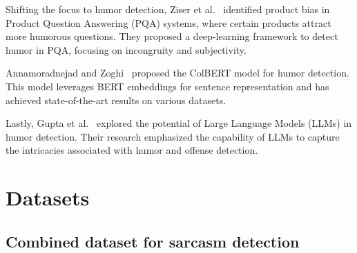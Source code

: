 \documentclass[10pt,twocolumn,letterpaper]{article}
\begin{document}
Shifting the focus to humor detection, Ziser et al.~\cite{ziser2020} identified product bias in Product Question Answering (PQA) systems, where certain products attract more humorous questions. They proposed a deep-learning framework to detect humor in PQA, focusing on incongruity and subjectivity.

Annamoradnejad and Zoghi~\cite{annamoradnejad2020} proposed the ColBERT model for humor detection. This model leverages BERT embeddings for sentence representation and has achieved state-of-the-art results on various datasets.

Lastly, Gupta et al.~\cite{gupta2021} explored the potential of Large Language Models (LLMs) in humor detection. Their research emphasized the capability of LLMs to capture the intricacies associated with humor and offense detection.


\section{Datasets}
\subsection{Combined dataset for sarcasm detection}
\end{document}
